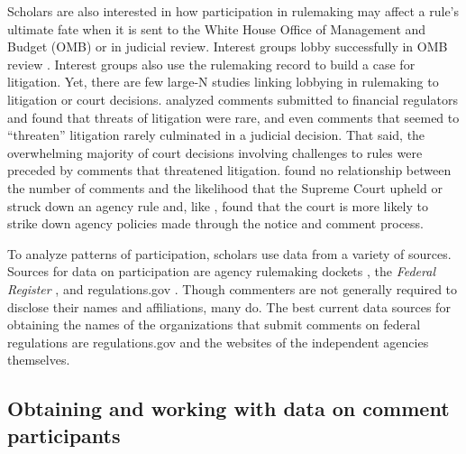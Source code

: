 \documentclass[
      12pt,
        ]{article}
\begin{document}
Scholars are also interested in how participation in rulemaking may
affect a rule's ultimate fate when it is sent to the White House Office
of Management and Budget (OMB) or in judicial review. Interest groups
lobby successfully in OMB review \citep{HaederAPSR2015}. Interest groups
also use the rulemaking record to build a case for litigation. Yet,
there are few large-N studies linking lobbying in rulemaking to
litigation or court decisions. \citet{LibgoberRashin2018SPSA} analyzed
comments submitted to financial regulators and found that threats of
litigation were rare, and even comments that seemed to ``threaten''
litigation rarely culminated in a judicial decision. That said, the
overwhelming majority of court decisions involving challenges to rules
were preceded by comments that threatened litigation.
\citet{judgelord2016MPSA} found no relationship between the number of
comments and the likelihood that the Supreme Court upheld or struck down
an agency rule and, like \citet{SchuckElliott1990}, found that the court
is more likely to strike down agency policies made through the notice
and comment process.

To analyze patterns of participation, scholars use data from a variety
of sources. Sources for data on participation are agency rulemaking
dockets
\citep{GoldenJPART1998, YackeeJPART2006, YoungBP2017, BanBP2019}, the
\emph{Federal Register} \citep{BallaAPSR1998, WestPAR2004}, and
regulations.gov \citep{BallaPI2019, GordonRashinJOP}. Though commenters
are not generally required to disclose their names and affiliations,
many do. The best current data sources for obtaining the names of the
organizations that submit comments on federal regulations are
regulations.gov and the websites of the independent agencies themselves.

\hypertarget{obtaining-and-working-with-data-on-comment-participants}{%
\subsection{Obtaining and working with data on comment
participants}\label{obtaining-and-working-with-data-on-comment-participants}}
\end{document}
